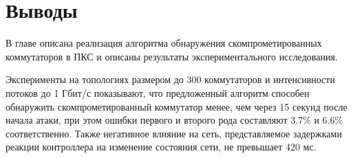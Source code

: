 \documentclass[../thesis.tex]{subfiles}
\begin{document}
\section{Выводы}

В главе описана реализация алгоритма обнаружения скомпрометированных коммутаторов в ПКС и описаны результаты экспериментального исследования.

Эксперименты на топологиях размером до 300 коммутаторов и интенсивности потоков до 1 Гбит/с показывают, что предложенный алгоритм способен обнаружить скомпрометированный коммутатор менее, чем через 15 секунд после начала атаки, при этом ошибки первого и второго рода составляют 3.7\% и 6.6\% соответственно.
Также негативное влияние на сеть, представляемое задержками реакции контроллера на изменение состояния сети, не превышает 420 мс.
\end{document}
